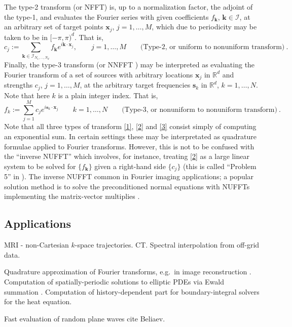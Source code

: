 \documentclass[10pt]{article}
\newcommand{\be}{\begin{equation}}
\newcommand{\ee}{\end{equation}}
\newcommand{\mbf}[1]{{\mathbf #1}}
\newcommand{\RR}{\mathbb{R}}
\newcommand{\xx}{\mbf{x}}
\newcommand{\sss}{\mbf{s}}
\newcommand{\kk}{\mbf{k}}
\newcommand{\KK}{{\mathcal I}}     %
\newcommand{\NU}{{nonuniform}}       %
\newcommand{\U}{{uniform}}
\begin{document}
The type-2 transform (or NFFT)
is, up to a normalization factor, the adjoint of the
type-1, and evaluates the Fourier series with given coefficients
$f_\kk$, $\kk\in\KK$, at an arbitrary set of target points
$\xx_j$, $j=1,\ldots,M$, which due to periodicity may be taken to be in $[-\pi,\pi)^d$.
  That is,
  \be
  c_j := \sum_{\kk\in\KK_{N_1,\dots,N_d}} f_\kk e^{i \kk\cdot \xx_j},
  \qquad j=1,\dots, M
\qquad \mbox{(Type-2, or \U\ to \NU\ transform)}
~.
\label{2}
\ee
Finally, the type-3 transform
\cite{nufft3} (or NNFFT \cite{usingnfft})
may be interpreted as evaluating the
Fourier transform of a set of sources with arbitrary locations $\xx_j$
in $\RR^d$
and strengths $c_j$, $j=1,\dots, M$, at the arbitrary target frequencies
$\sss_k$ in $\RR^d$, $k=1,\dots, N$. Note that here $k$ is a plain integer
index.
That is,
\be
f_k := \sum_{j=1}^M c_j e^{i \sss_k \cdot \xx_j}
  \qquad k=1,\dots, N
\qquad \mbox{(Type-3, or \NU\ to \NU\ transform)}
~.
\label{3}
\ee
Note that all three types of transform \eqref{1}, \eqref{2} and \eqref{3}
consist simply of computing an exponential sum.
In certain settings these may be interpretated as quadrature formulae
applied to Fourier transforms.
However, this is not to be confused with the ``inverse NUFFT'' which involves,
for instance, treating \eqref{2} as a large linear system to be solved for
$\{f_\kk\}$ given a right-hand side
$\{c_j\}$ (this is called ``Problem 5'' in \cite{nufft}).
The inverse NUFFT common in Fourier imaging
applications; a popular solution method is to solve
the preconditioned normal equations with
NUFFTs implementing the matrix-vector multiplies
\cite{fessler,fourmont,fastsinc,gelbrecon}.







\subsection{Applications}

MRI - non-Cartesian $k$-space trajectories.
CT.
Spectral interpolation from off-grid data.

Quadrature approximation of Fourier transforms, e.g.\
in image reconstruction \cite{cryo}.
Computation of spatially-periodic solutions to elliptic
PDEs via Ewald summation
\cite{lindbo11}.
Computation of history-dependent part for boundary-integral solvers
for the heat equation.%

Fast evaluation of random plane waves cite Beliaev.
\end{document}
